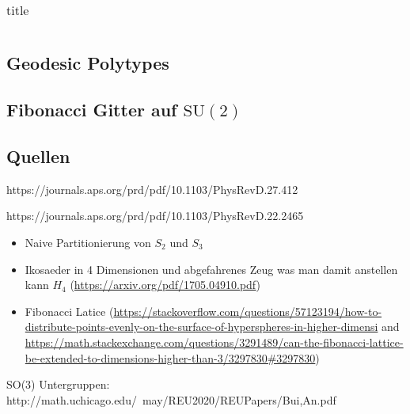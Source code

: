 \begin{table}
  \centering
  \begin{tabular}{c|c|c}

  \end{tabular}
  \caption{title}
\end{table}

\subsection{Geodesic Polytypes}

\subsection{Fibonacci Gitter auf $\mathrm{SU}(2)$}

\subsection{Quellen}

https://journals.aps.org/prd/pdf/10.1103/PhysRevD.27.412

https://journals.aps.org/prd/pdf/10.1103/PhysRevD.22.2465


\begin{itemize}
 \item Naive Partitionierung von $S_2$ und $S_3$
 \item Ikosaeder in 4 Dimensionen und abgefahrenes Zeug was man damit anstellen kann $H_4$ (\url{https://arxiv.org/pdf/1705.04910.pdf})
 \item Fibonacci Latice (\url{https://stackoverflow.com/questions/57123194/how-to-distribute-points-evenly-on-the-surface-of-hyperspheres-in-higher-dimensi} and \url{https://math.stackexchange.com/questions/3291489/can-the-fibonacci-lattice-be-extended-to-dimensions-higher-than-3/3297830#3297830})
\end{itemize}
SO(3) Untergruppen: http://math.uchicago.edu/~may/REU2020/REUPapers/Bui,An.pdf
